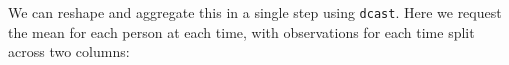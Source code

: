 \documentclass[]{article}
\newenvironment{Shaded}{\begin{snugshade}}{\end{snugshade}}
\newcommand{\DataTypeTok}[1]{\textcolor[rgb]{0.13,0.29,0.53}{#1}}
\newcommand{\KeywordTok}[1]{\textcolor[rgb]{0.13,0.29,0.53}{\textbf{#1}}}
\newcommand{\NormalTok}[1]{#1}
\newcommand{\OperatorTok}[1]{\textcolor[rgb]{0.81,0.36,0.00}{\textbf{#1}}}
\newcommand{\StringTok}[1]{\textcolor[rgb]{0.31,0.60,0.02}{#1}}
\begin{document}
We can reshape and aggregate this in a single step using \texttt{dcast}. Here we
request the mean for each person at each time, with observations for each time
split across two columns:

\begin{Shaded}
\end{Shaded}
\end{document}
